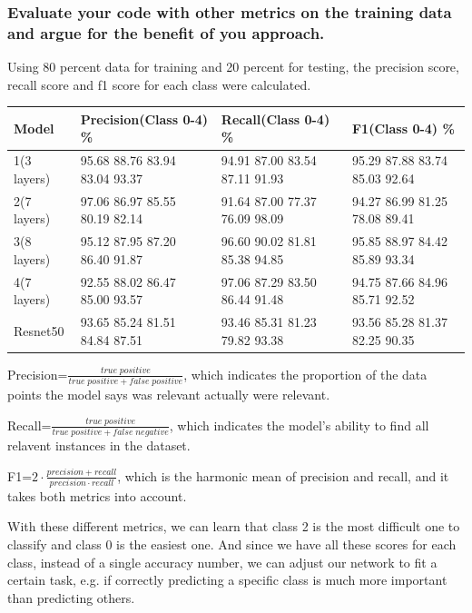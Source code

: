 \documentclass[12pt]{article}
\begin{document}
\subsubsection{Evaluate your code with other metrics on the training data and argue for the benefit of you approach.}

Using 80 percent data for training and 20 percent for testing, the precision score, recall score and f1 score for each class were calculated.
\begin{center}
\small
\begin{tabular}{|p{1.8cm}|p{4.8cm}|p{4.8cm}|p{4.8cm}|}
\hline
\textbf{Model} & \textbf{Precision(Class 0-4) \%} & \textbf{Recall(Class 0-4) \%} & \textbf{F1(Class 0-4) \%}\\ 
\hline
1(3 layers) & 95.68 88.76 83.94 83.04 93.37 & 94.91 87.00 83.54 87.11 91.93 & 95.29 87.88 83.74 85.03 92.64\\ 
\hline
2(7 layers) & 97.06 86.97 85.55 80.19 82.14 & 91.64 87.00 77.37 76.09 98.09 & 94.27 86.99 81.25 78.08 89.41\\ 
\hline
3(8 layers) & 95.12 87.95 87.20 86.40 91.87 & 96.60 90.02 81.81 85.38 94.85 & 95.85 88.97 84.42 85.89 93.34\\ 
\hline
4(7 layers) & 92.55 88.02 86.47 85.00 93.57 & 97.06 87.29 83.50 86.44 91.48 & 94.75 87.66 84.96 85.71 92.52\\
\hline
Resnet50 & 93.65 85.24 81.51 84.84 87.51 & 93.46 85.31 81.23 79.82 93.38 & 93.56 85.28 81.37 82.25 90.35\\
\hline
\end{tabular}
\end{center}

Precision=$\frac{true\;positive}{true\;positive+false\;positive}$, which indicates the proportion of the data points the model says was relevant actually were relevant.

Recall=$\frac{true\;positive}{true\;positive+false\;negative}$, which indicates the model's ability to find all relavent instances in the dataset.

F1=$2\cdot\frac{precision+recall}{precision\cdot recall}$, which is the harmonic mean of precision and recall, and it takes both metrics into account.

With these different metrics, we can learn that class 2 is the most difficult one to classify and class 0 is the easiest one. And since we have all these scores for each class, instead of a single accuracy number, we can adjust our network to fit a certain task, e.g. if correctly predicting a specific class is much more important than predicting others.
\end{document}

